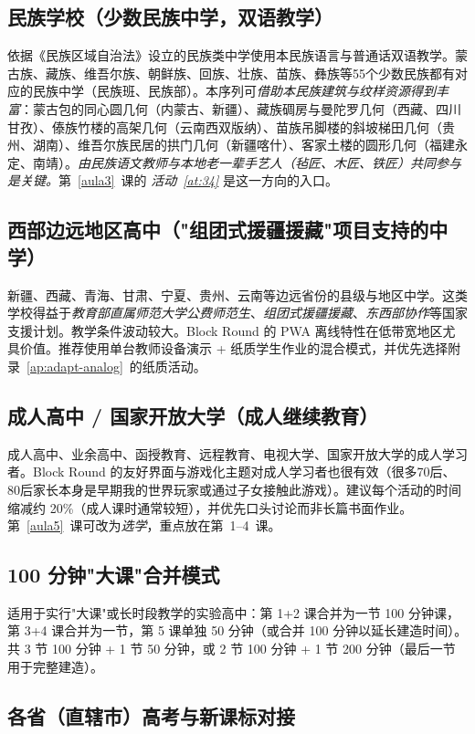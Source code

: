 \documentclass[12pt,a4paper]{scrartcl}
\begin{document}
\subsection{民族学校（少数民族中学，双语教学）}
依据《民族区域自治法》设立的民族类中学使用本民族语言与普通话双语教学。蒙古族、藏族、维吾尔族、朝鲜族、回族、壮族、苗族、彝族等55个少数民族都有对应的民族中学（民族班、民族部）。本序列可\emph{借助本民族建筑与纹样资源得到丰富}：蒙古包的同心圆几何（内蒙古、新疆）、藏族碉房与曼陀罗几何（西藏、四川甘孜）、傣族竹楼的高架几何（云南西双版纳）、苗族吊脚楼的斜坡梯田几何（贵州、湖南）、维吾尔族民居的拱门几何（新疆喀什）、客家土楼的圆形几何（福建永定、南靖）。\emph{由民族语文教师与本地老一辈手艺人（毡匠、木匠、铁匠）共同参与是关键。}第~\ref{aula3}~课的 \emph{活动~\ref{at:34}} 是这一方向的入口。

\subsection{西部边远地区高中（"组团式援疆援藏"项目支持的中学）}
新疆、西藏、青海、甘肃、宁夏、贵州、云南等边远省份的县级与地区中学。这类学校得益于\emph{教育部直属师范大学公费师范生}、\emph{组团式援疆援藏}、\emph{东西部协作}等国家支援计划。教学条件波动较大。Block Round 的 PWA 离线特性在低带宽地区尤具价值。推荐使用单台教师设备演示 + 纸质学生作业的混合模式，并优先选择附录~\ref{ap:adapt-analog}~的纸质活动。

\subsection{成人高中 / 国家开放大学（成人继续教育）}
成人高中、业余高中、函授教育、远程教育、电视大学、国家开放大学的成人学习者。Block Round 的友好界面与游戏化主题对成人学习者也很有效（很多70后、80后家长本身是早期我的世界玩家或通过子女接触此游戏）。建议每个活动的时间缩减约 20\%（成人课时通常较短），并优先口头讨论而非长篇书面作业。第~\ref{aula5}~课可改为\emph{选学}，重点放在第~1--4~课。

\subsection{100 分钟"大课"合并模式}
适用于实行"大课"或长时段教学的实验高中：第 1+2 课合并为一节 100 分钟课，第 3+4 课合并为一节，第 5 课单独 50 分钟（或合并 100 分钟以延长建造时间）。共 3 节 100 分钟 + 1 节 50 分钟，或 2 节 100 分钟 + 1 节 200 分钟（最后一节用于完整建造）。

\subsection{各省（直辖市）高考与新课标对接}
\end{document}
